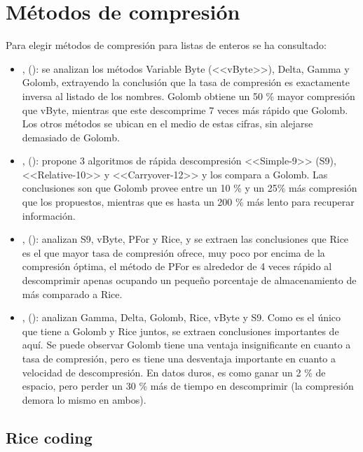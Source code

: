 \section{Métodos de compresión}

Para elegir métodos de compresión para listas de enteros se ha consultado:

\begin{itemize}

\item \citet{Trotman:2003}, (\citeyear{Trotman:2003}): se analizan los métodos Variable Byte (<<vByte>>), Delta, Gamma y Golomb, extrayendo la conclusión que la tasa de compresión es exactamente inversa al listado de los nombres. Golomb obtiene un 50 \% mayor compresión que vByte, mientras que este descomprime 7 veces más rápido que Golomb. Los otros métodos se ubican en el medio de estas cifras, sin alejarse demasiado de Golomb.

\item \citet{Anh:2005}, (\citeyear{Anh:2005}): propone 3 algoritmos de rápida descompresión <<Simple-9>> (S9), <<Relative-10>> y <<Carryover-12>> y los compara a Golomb. Las conclusiones son que Golomb provee entre un 10 \% y un 25\% más compresión que los propuestos, mientras que es hasta un 200 \% más lento para recuperar información.

\item \citet{Zhang:2008}, (\citeyear{Zhang:2008}): analizan S9, vByte, PFor y Rice, y se extraen las conclusiones que Rice es el que mayor tasa de compresión ofrece, muy poco por encima de la compresión óptima, el método de PFor es alrededor de 4 veces rápido al descomprimir apenas ocupando un pequeño porcentaje de almacenamiento de más comparado a Rice.

\item \citet[p.~210]{Buettcher2010}, (\citeyear{Buettcher2010}): analizan Gamma, Delta, Golomb, Rice, vByte y S9. Como es el único que tiene a Golomb y Rice juntos, se extraen conclusiones importantes de aquí. Se puede observar Golomb tiene una ventaja insignificante en cuanto a tasa de compresión, pero es tiene una desventaja importante en cuanto a velocidad de descompresión. En datos duros, es como ganar un 2 \% de espacio, pero perder un 30 \% más de tiempo en descomprimir (la compresión demora lo mismo en ambos).



\end{itemize}

\subsection{Rice coding}

